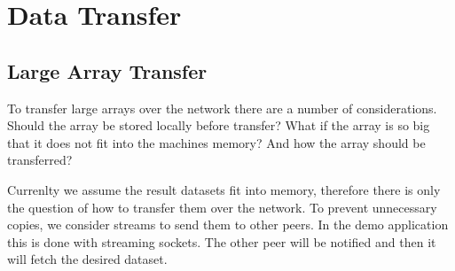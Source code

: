 \chapter{Data Transfer}
\label{cha:data}

\section{Large Array Transfer}
To transfer large arrays over the network there are a number of considerations. Should the array be stored locally before transfer? What if the array is so big that it does not fit into the machines memory? And how the array should be transferred?

Currenlty we assume the result datasets fit into memory, therefore there is only the question of how to transfer them over the network. To prevent unnecessary copies, we consider streams to send them to other peers. In the demo application this is done with streaming sockets. The other peer will be notified and then it will fetch the desired dataset.
